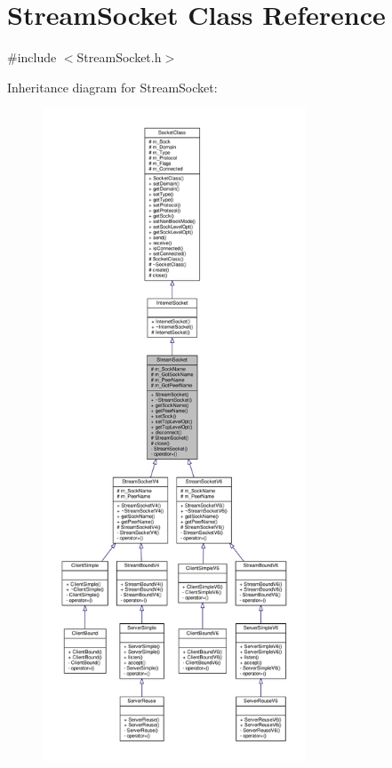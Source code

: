 \hypertarget{classStreamSocket}{}\section{Stream\+Socket Class Reference}
\label{classStreamSocket}


{\ttfamily \#include $<$Stream\+Socket.\+h$>$}



Inheritance diagram for Stream\+Socket\+:\nopagebreak
\begin{figure}[H]
\begin{center}
\leavevmode
\includegraphics[height=550pt]{classStreamSocket__inherit__graph}
\end{center}
\end{figure}
